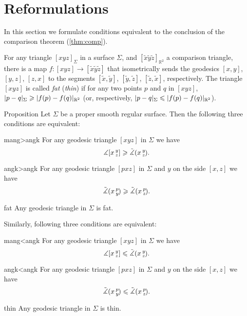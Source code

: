 \section{Reformulations}

In this section we formulate conditions equivalent to the conclusion of the comparison theorem (\ref{thm:comp}).

For any triangle $[xyz]_{\Sigma}$ in a surface $\Sigma$, and $[\tilde x \tilde y \tilde z]_{\mathbb{R}^2}$ a comparison triangle, there is a map $f :[xyz]\to [\tilde x \tilde y \tilde z ]$ that isometrically  sends the geodesics $[x,y]$, $[y,z]$, $[z,x]$ to the segments $[\tilde x , \tilde y ]$, $[\tilde y , \tilde z]$, $[ \tilde z , \tilde x ]$, respectively.
The triangle $[xyz]$ is called \emph{fat} (\emph{thin})
if for any two points $p$ and $q$  in $[xyz]$,  $\dist{p}{q}{\Sigma}\ge |f( p)- f( q)|_{\mathbb{R}^2}$ (or, respectively, $\dist{p}{q}{\Sigma}\le | f( p) - f( q) |_{\mathbb{R}^2}$).


\begin{thm}{Proposition}\label{prop:comp-reformulations}
Let $\Sigma$ be a proper smooth regular surface.
Then the following three conditions are equivalent:

\begin{subthm}{mang>angk}
For any geodesic triangle $[xyz]$ in $\Sigma$ we have
 \[\measuredangle[x\,{}^{y}_{z}]\geqslant\tilde\measuredangle(x\,{}^{y}_{z}\hspace{-0.2ex}).\]
\end{subthm}

\begin{subthm}{angk>angk} For any geodesic triangle $[pxz]$ in $\Sigma$ and $y$ on the side $[x,z]$ we have
 \[\tilde\measuredangle(x\,{}^{p}_{y}\hspace{-0.2ex}) \geqslant \tilde\measuredangle(x\,{}^{p}_{z}\hspace{-0.2ex}).\]
 
\end{subthm}

\begin{subthm}{fat}
 Any geodesic triangle in $\Sigma$ is fat.
\end{subthm}


\medskip

Similarly, following three conditions are equivalent:

\begin{subthmA}{mang<angk}
For any geodesic triangle $[xyz]$ in $\Sigma$ we have
 \[\measuredangle[x\,{}^{y}_{z}]\leqslant\tilde\measuredangle(x\,{}^{y}_{z}\hspace{-0.2ex}).\]
\end{subthmA}

\begin{subthmA}{angk<angk} For any geodesic triangle $[pxz]$ in $\Sigma$ and $y$ on the side $[x,z]$ we have
 \[\tilde\measuredangle(x\,{}^{p}_{y}\hspace{-0.2ex}) \leqslant \tilde\measuredangle(x\,{}^{p}_{z}\hspace{-0.2ex}).\]
\end{subthmA}

\begin{subthmA}{thin}
Any geodesic triangle in $\Sigma$ is thin.
\end{subthmA}

\end{thm}

